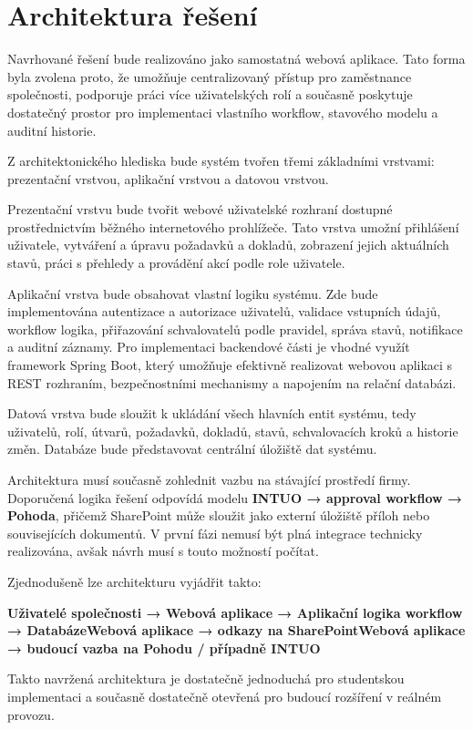 \section{Architektura řešení}

Navrhované řešení bude realizováno jako samostatná webová aplikace. Tato forma byla zvolena proto, že umožňuje centralizovaný přístup pro zaměstnance společnosti, podporuje práci více uživatelských rolí a současně poskytuje dostatečný prostor pro implementaci vlastního workflow, stavového modelu a auditní historie.

Z architektonického hlediska bude systém tvořen třemi základními vrstvami: prezentační vrstvou, aplikační vrstvou a datovou vrstvou.

Prezentační vrstvu bude tvořit webové uživatelské rozhraní dostupné prostřednictvím běžného internetového prohlížeče. Tato vrstva umožní přihlášení uživatele, vytváření a úpravu požadavků a dokladů, zobrazení jejich aktuálních stavů, práci s přehledy a provádění akcí podle role uživatele.

Aplikační vrstva bude obsahovat vlastní logiku systému. Zde bude implementována autentizace a autorizace uživatelů, validace vstupních údajů, workflow logika, přiřazování schvalovatelů podle pravidel, správa stavů, notifikace a auditní záznamy. Pro implementaci backendové části je vhodné využít framework Spring Boot, který umožňuje efektivně realizovat webovou aplikaci s REST rozhraním, bezpečnostními mechanismy a napojením na relační databázi.

Datová vrstva bude sloužit k ukládání všech hlavních entit systému, tedy uživatelů, rolí, útvarů, požadavků, dokladů, stavů, schvalovacích kroků a historie změn. Databáze bude představovat centrální úložiště dat systému.

Architektura musí současně zohlednit vazbu na stávající prostředí firmy. Doporučená logika řešení odpovídá modelu \textbf{INTUO → approval workflow → Pohoda}, přičemž SharePoint může sloužit jako externí úložiště příloh nebo souvisejících dokumentů. V první fázi nemusí být plná integrace technicky realizována, avšak návrh musí s touto možností počítat.

Zjednodušeně lze architekturu vyjádřit takto:

\textbf{Uživatelé společnosti → Webová aplikace → Aplikační logika workflow → DatabázeWebová aplikace → odkazy na SharePointWebová aplikace → budoucí vazba na Pohodu / případně INTUO}

Takto navržená architektura je dostatečně jednoduchá pro studentskou implementaci a současně dostatečně otevřená pro budoucí rozšíření v reálném provozu.


